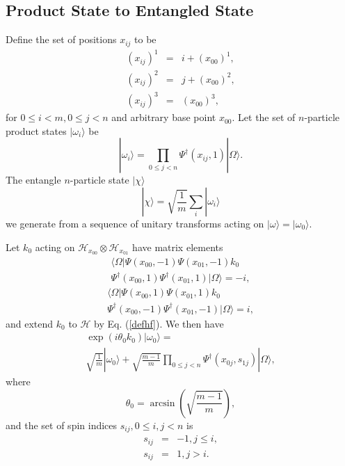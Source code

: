 \documentclass[12pt,amsmath,amssymb,onecolumn]{revtex4-2}
\begin{document}
\subsection{\label{app:subsecfirst}Product State to Entangled State}

Define the set of positions $x_{ij}$ to be
\begin{subequations}
\begin{eqnarray}
\label{defxij0}
(x_{ij})^1 & = & i + (x_{00})^1 ,\\
\label{defxij1}
(x_{ij})^2 & = & j + (x_{00})^2,\\
\label{defxij2}
(x_{ij})^3 & = & (x_{00})^3,
\end{eqnarray}
\end{subequations}
for $0 \le i < m, 0 \le j < n$ and arbitrary base point $x_{00}$.
Let the set of $n$-particle product states $|\omega_i \rangle $ be
\begin{equation}
\label{defomega}
|\omega_i \rangle   =  \prod_{0 \le j < n} \Psi^\dagger( x_{ij}, 1) |\Omega \rangle .
\end{equation}
The entangle $n$-particle state $|\chi \rangle $
\begin{equation}
\label{defchi}
|\chi \rangle  = \sqrt{\frac{1}{m}} \sum_i |\omega_i \rangle 
\end{equation}
we generate from a sequence of unitary transforms acting
on $|\omega \rangle  = |\omega_0 \rangle $.



Let $k_{0}$ acting on $\mathcal{H}_{x_{00}} \otimes \mathcal{H}_{x_{01}}$
have matrix elements
\begin{multline}
\label{defk01}
 \langle  \Omega| \Psi( x_{00}, -1) \Psi( x_{01}, -1) k_0  \\
\Psi^{\dagger}(x_{00},1) \Psi^{\dagger}( x_{01},1)|\Omega \rangle  = -i,
\end{multline}
\begin{multline}
\label{defk10}
 \langle  \Omega| \Psi(x_{00},1) \Psi( x_{01}, 1) k_0 
 \\ \Psi^{\dagger}(x_{00},-1) \Psi^{\dagger}( x_{01},-1)|\Omega \rangle  = i,
\end{multline}
and extend $k_0$ to $\mathcal{H}$ by Eq. (\ref{defhf}). 
We then have
\begin{multline}
\label{k00}
\exp( i \theta_0 k_0) |\omega_0 \rangle  = \\
\sqrt{\frac{1}{m}} |\omega_0 \rangle  + 
\sqrt{\frac{m - 1}{m}} \prod_{0 \le j < n} \Psi^{\dagger}( x_{0j}, s_{1j}) |\Omega \rangle ,
\end{multline}
where
\begin{equation}
\label{defarcsin}
\theta_0 = \arcsin( \sqrt{\frac{m - 1}{m}}),
\end{equation}
and the set of spin indices $s_{ij}, 0 \le i,j < n$ is
\begin{subequations}
\begin{eqnarray}
\label{defsj0}
s_{ij} & = & -1, j \le i, \\
\label{defsj1}
s_{ij} & = & 1, j  >  i.
\end{eqnarray}
\end{subequations}
\end{document}
